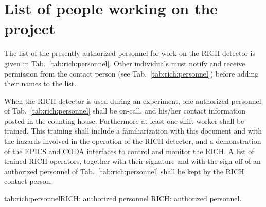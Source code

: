 \section{List of people working on the project} 
 
The list
of the presently authorized personnel for work on the RICH detector 
is given in Tab.~\ref{tab:rich:personnel}.
Other individuals must notify and receive permission from
the contact person (see Tab.~\ref{tab:rich:personnel}) before adding their names 
to the list. 

When the RICH detector is used during an experiment, one authorized personnel of 
Tab.~\ref{tab:rich:personnel} shall be on-call, and his/her contact information
posted in the counting house. Furthermore at least one shift worker shall be 
trained. 
This training shall include a familiarization with this document and with 
the hazards involved in the operation of the RICH detector, and a demonstration
of the EPICS and CODA interfaces to control and monitor the RICH.
A list of trained RICH operators, together with their signature and 
with the sign-off of an authorized personnel of Tab.~\ref{tab:rich:personnel}
shall be kept by the RICH contact person.


\begin{namestab}{tab:rich:personnel}{RICH: authorized personnel}{
RICH: authorized personnel.}
 \MauroIodice{}
 \FrancescoCusanno{}
\end{namestab}


